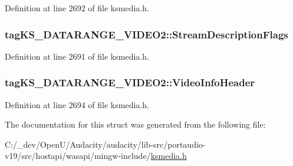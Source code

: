 Definition at line 2692 of file ksmedia.\+h.

\subsubsection[{\texorpdfstring{Stream\+Description\+Flags}{StreamDescriptionFlags}}]{ tag\+K\+S\+\_\+\+D\+A\+T\+A\+R\+A\+N\+G\+E\+\_\+\+V\+I\+D\+E\+O2\+::\+Stream\+Description\+Flags}\hypertarget{structtag_k_s___d_a_t_a_r_a_n_g_e___v_i_d_e_o2_a5417b1bfc198f166829228913633a1a6}{}\label{structtag_k_s___d_a_t_a_r_a_n_g_e___v_i_d_e_o2_a5417b1bfc198f166829228913633a1a6}


Definition at line 2691 of file ksmedia.\+h.

\subsubsection[{\texorpdfstring{Video\+Info\+Header}{VideoInfoHeader}}]{ tag\+K\+S\+\_\+\+D\+A\+T\+A\+R\+A\+N\+G\+E\+\_\+\+V\+I\+D\+E\+O2\+::\+Video\+Info\+Header}\hypertarget{structtag_k_s___d_a_t_a_r_a_n_g_e___v_i_d_e_o2_ab7792921199be45e7619151a99a6620b}{}\label{structtag_k_s___d_a_t_a_r_a_n_g_e___v_i_d_e_o2_ab7792921199be45e7619151a99a6620b}


Definition at line 2694 of file ksmedia.\+h.



The documentation for this struct was generated from the following file\+:\begin{DoxyCompactItemize}
\item 
C\+:/\+\_\+dev/\+Open\+U/\+Audacity/audacity/lib-\/src/portaudio-\/v19/src/hostapi/wasapi/mingw-\/include/\hyperlink{ksmedia_8h}{ksmedia.\+h}\end{DoxyCompactItemize}
